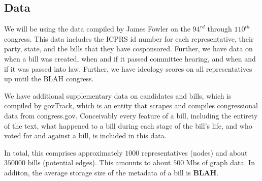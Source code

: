 \subsection{Data}

\vspace{5mm}
\noindent
We will be using the data compiled by James Fowler on the $94^{rd}$ through 
$110^{th}$ congress. This data includes the ICPRS id number for each 
representative, their party, state, and the bills that they have cosponsored. 
Further, we have data on when a bill was created, when and if it passed 
committee hearing, and when and if it was passed into law. Further, we have 
ideology scores on all representatives up until the BLAH congress.

\vspace{5mm}
\noindent
We have additional supplementary data on candidates and bills, which is compiled 
by govTrack, which is an entity that scrapes and compiles congressional data 
from congress.gov. Conceivably every feature of a bill, including the 
entirety of the text, what happened to a bill during each stage of the 
bill's life, and who voted for and against a bill, is included in this data. 

\vspace{5mm}
\noindent
In total, this comprises approximately $1000$ representatives (nodes) and about 
$350000$ bills (potential edges). This amounts to about $500$ Mbs of graph 
data. In additon, the average storage size of the metadata of a bill is 
\textbf{BLAH}.
